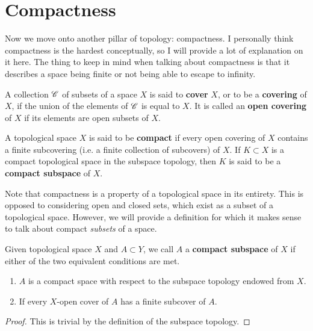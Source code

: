 \section{Compactness} 

  Now we move onto another pillar of topology: compactness. I personally think compactness is the hardest conceptually, so I will provide a lot of explanation on it here. The thing to keep in mind when talking about compactness is that it describes a space being finite or not being able to escape to infinity.  
  
  \begin{definition}[Covers]
    A collection $\operatorname{\mathscr{C}}$ of subsets of a space $X$ is said to \textbf{cover} $X$, or to be a \textbf{covering} of $X$, if the union of the elements of $\operatorname{\mathscr{C}}$ is equal to $X$. It is called an \textbf{open covering} of $X$ if its elements are open subsets of $X$. 
  \end{definition}

  \begin{definition}
    A topological space $X$ is said to be \textbf{compact} if every open covering of $X$ contains a finite subcovering (i.e. a finite collection of subcovers) of $X$. If $K \subset X$ is a compact topological space in the subspace topology, then $K$ is said to be a \textbf{compact subspace} of $X$. 
  \end{definition}

  Note that compactness is a property of a topological space in its entirety. This is opposed to considering open and closed sets, which exist as a subset of a topological space. However, we will provide a definition for which it makes sense to talk about compact \textit{subsets} of a space. 

  \begin{definition}
    Given topological space $X$ and $A \subset Y$, we call $A$ a \textbf{compact subspace} of $X$ if either of the two equivalent conditions are met. 
    \begin{enumerate}
      \item $A$ is a compact space with respect to the subspace topology endowed from $X$. 
      \item If every $X$-open cover of $A$ has a finite subcover of $A$. 
    \end{enumerate}
  \end{definition}
  \begin{proof}
    This is trivial by the definition of the subspace topology. 
  \end{proof}
   
